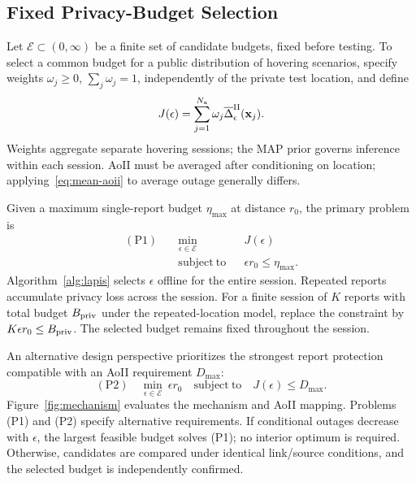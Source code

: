\subsection{Fixed Privacy-Budget Selection}
Let $\mathcal E\subset(0,\infty)$ be a finite set of candidate budgets, fixed before testing. To select a common budget for a public distribution of hovering scenarios, specify weights $\omega_j\ge0$, $\sum_j\omega_j=1$, independently of the private test location, and define
\begin{equation}
 J(\epsilon)=\sum_{j=1}^{N_{\mathrm x}}\omega_j
           \overline\Delta_\epsilon^{\rm II}(\mathbf x_j).
 \label{eq:scenario-cost}
\end{equation}
Weights aggregate separate hovering sessions; the MAP prior governs inference within each session. AoII must be averaged after conditioning on location; applying~\eqref{eq:mean-aoii} to average outage generally differs.

Given a maximum single-report budget $\eta_{\max}$ at distance $r_0$, the primary problem is
\begin{equation}
 \begin{aligned}
 \mathrm{(P1)}\quad&\min_{\epsilon\in\mathcal E}&&J(\epsilon)\\
 &\mathrm{subject\ to}&&\epsilon r_0\le\eta_{\max}.
 \end{aligned}
 \label{eq:p1}
\end{equation}
Algorithm~\ref{alg:lapis} selects $\epsilon$ offline for the entire session. Repeated reports accumulate privacy loss across the session. For a finite session of $K$ reports with total budget $B_{\rm priv}$ under the repeated-location model, replace the constraint by $K\epsilon r_0\le B_{\rm priv}$. The selected budget remains fixed throughout the session.

An alternative design perspective prioritizes the strongest report protection compatible with an AoII requirement $D_{\max}$:
\begin{equation}
 \mathrm{(P2)}\quad
 \min_{\epsilon\in\mathcal E}\ \epsilon r_0
 \quad\mathrm{subject\ to}\quad J(\epsilon)\le D_{\max}.
 \label{eq:p2}
\end{equation}
Figure~\ref{fig:mechanism} evaluates the mechanism and AoII mapping. Problems (P1) and (P2) specify alternative requirements. If conditional outages decrease with $\epsilon$, the largest feasible budget solves (P1); no interior optimum is required. Otherwise, candidates are compared under identical link/source conditions, and the selected budget is independently confirmed.


